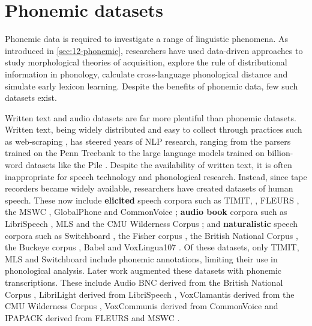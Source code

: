\section{Phonemic datasets}\label{sec:13-phonemicdatasets}


Phonemic data is required to investigate a range of linguistic phenomena. As introduced in \cref{sec:12-phonemic}, researchers have used data-driven approaches to study morphological theories of acquisition, explore the rule of distributional information in phonology, calculate cross-language phonological distance and simulate early lexicon learning. Despite the benefits of phonemic data, few such datasets exist. 

Written text and audio datasets are far more plentiful than phonemic datasets. Written text, being widely distributed and easy to collect through practices such as web-scraping \citep{bansal-2022-datascaling}, has steered years of NLP research, ranging from the parsers trained on the Penn Treebank \citep{taylor2003penn} to the large language models trained on billion-word datasets like the Pile \citep{pile}. Despite the availability of written text, it is often inappropriate for speech technology and phonological research. Instead, since tape recorders became widely available, researchers have created datasets of human speech. These now include \textbf{elicited} speech corpora such as TIMIT, \citep{garofolo1993darpa}, FLEURS \citep{conneau2023fleurs}, the MSWC \citep{mazumder2021multilingual}, GlobalPhone \citep{schultz2002globalphone} and CommonVoice \citep{ardila-etal-2020-common}; \textbf{audio book} corpora such as LibriSpeech \citep{panayotov2015librispeech}, MLS \citep{pratap2020mls} and the CMU Wilderness Corpus \citep{8683536}; and \textbf{naturalistic} speech corpora such as Switchboard \citep{godfrey1992switchboard}, the Fisher corpus \citep{cieri2004fisher}, the British National Corpus \citep{bnc2007}, the Buckeye corpus \citep{pitt2007buckeye}, Babel \citep{harper2011babel} and VoxLingua107 \citep{9383459}. Of these datasets, only TIMIT, MLS and Switchboard include phonemic annotations, limiting their use in phonological analysis. Later work augmented these datasets with phonemic transcriptions. These include Audio BNC derived from the British National Corpus \citep{coleman2011mining}, LibriLight derived from LibriSpeech \citep{Kahn_2020}, VoxClamantis derived from the CMU Wilderness Corpus \citep{salesky-etal-2020-corpus}, VoxCommunis derived from CommonVoice \citep{ahn-chodroff-2022-voxcommunis} and IPAPACK derived from FLEURS and MSWC \citep{zhu-etal-2024-taste}.


